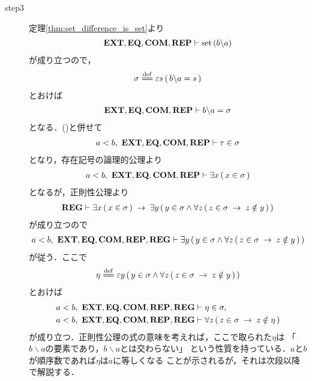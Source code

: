 \begin{prf}
\begin{description}
			\item[step3] 定理\ref{thm:set_difference_is_set}より
				\begin{align}
					\mbox{{\bf EXT}},\mbox{{\bf EQ}},\mbox{\bf COM},\mbox{{\bf REP}} \vdash \operatorname*{set}\hspace{0.15em}(b \backslash a)
				\end{align}
				が成り立つので，
				\begin{align}
					\sigma \defeq \varepsilon s\, (\, b \backslash a = s\, )
				\end{align}
				とおけば
				\begin{align}
					\mbox{{\bf EXT}},\mbox{{\bf EQ}},\mbox{\bf COM},\mbox{{\bf REP}} \vdash b \backslash a = \sigma
					\label{fom:element_and_proper_subset_correspond_8}
				\end{align}
				となる．()と併せて
				\begin{align}
					a < b,\ \mbox{{\bf EXT}},\mbox{{\bf EQ}},\mbox{\bf COM},\mbox{{\bf REP}} \vdash \tau \in \sigma
				\end{align}
				となり，存在記号の論理的公理より
				\begin{align}
					a < b,\ \mbox{{\bf EXT}},\mbox{{\bf EQ}},\mbox{\bf COM},\mbox{{\bf REP}} \vdash \exists x\, (\, x \in \sigma\, )
				\end{align}
				となるが，正則性公理より
				\begin{align}
					\mbox{{\bf REG}} \vdash \exists x\, (\, x \in \sigma\, ) 
					\hspace{0.25em}\rightarrow\hspace{0.25em} \exists y\, (\, y \in \sigma \wedge \forall z\, (\, z \in \sigma \hspace{0.25em}\rightarrow\hspace{0.25em} z \notin y\, )\, )
				\end{align}
				が成り立つので
				\begin{align}
					a < b,\ \mbox{{\bf EXT}},\mbox{{\bf EQ}},\mbox{\bf COM},\mbox{{\bf REP}},\mbox{{\bf REG}} \vdash 
					\exists y\, (\, y \in \sigma \wedge \forall z\, (\, z \in \sigma \hspace{0.25em}\rightarrow\hspace{0.25em} z \notin y\, )\, )
				\end{align}
				が従う．ここで
				\begin{align}
					\eta \defeq \varepsilon y\, (\, y \in \sigma \wedge 
					\forall z\, (\, z \in \sigma \rarrow z \notin y\, )\, )
				\end{align}
				とおけば
				\begin{align}
					a < b,\ \mbox{{\bf EXT}},\mbox{{\bf EQ}},\mbox{\bf COM},\mbox{{\bf REP}},\mbox{{\bf REG}} &\vdash \eta \in \sigma, 
					\label{fom:element_and_proper_subset_correspond_9} \\
					a < b,\ \mbox{{\bf EXT}},\mbox{{\bf EQ}},\mbox{\bf COM},\mbox{{\bf REP}},\mbox{{\bf REG}} &\vdash 
					\forall z\, (\, z \in \sigma \hspace{0.25em}\rightarrow\hspace{0.25em} z \notin \eta\, )
					\label{fom:element_and_proper_subset_correspond_10}
				\end{align}
				が成り立つ．正則性公理の式の意味を考えれば，ここで取られた$\eta$は
				「$b \backslash a$の要素であり，$b \backslash a$とは交わらない」
				という性質を持っている．$a$と$b$が順序数であれば$\eta$は$a$に等しくなる
				ことが示されるが，それは次段以降で解説する．
				

\end{description}
\end{prf}
